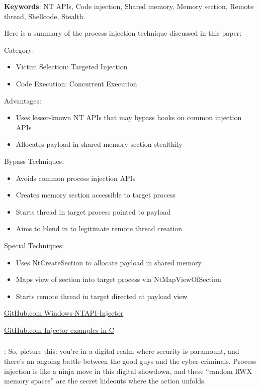 \documentclass{article}
\begin{document}
\textbf{Keywords}: NT APIs, Code injection, Shared memory, Memory section, Remote thread, Shellcode, Stealth.

Here is a summary of the process injection technique discussed in this paper:

Category:
\begin{itemize}
\item Victim Selection: Targeted Injection
\item Code Execution: Concurrent Execution
\end{itemize}

Advantages:
\begin{itemize}
\item Uses lesser-known NT APIs that may bypass hooks on common injection APIs
\item Allocates payload in shared memory section stealthily
\end{itemize}

Bypass Techniques:
\begin{itemize}
\item Avoids common process injection APIs
\item Creates memory section accessible to target process
\item Starts thread in target process pointed to payload
\item Aims to blend in to legitimate remote thread creation
\end{itemize}

Special Techniques:
\begin{itemize}
\item Uses NtCreateSection to allocate payload in shared memory
\item Maps view of section into target process via NtMapViewOfSection
\item Starts remote thread in target directed at payload view
\end{itemize}


\href{https://github.com/elddy/Windows-NTAPI-Injector}{GitHub.com Windows-NTAPI-Injector}

\href{https://gist.github.com/WKL-Sec/96e17188e4c159c2cdf7ff2c111130cc#file-local-c}{GitHub.com Injector examples in C}


\subsubsection{\textcite{S12h4ck:2023b}}
\textbf{}:  So, picture this: you’re in a digital realm where security is paramount, and there’s an ongoing battle between the good guys and the cyber-criminals. Process injection is like a ninja move in this digital showdown, and these “random RWX memory spaces” are the secret hideouts where the action unfolds.
\end{document}

